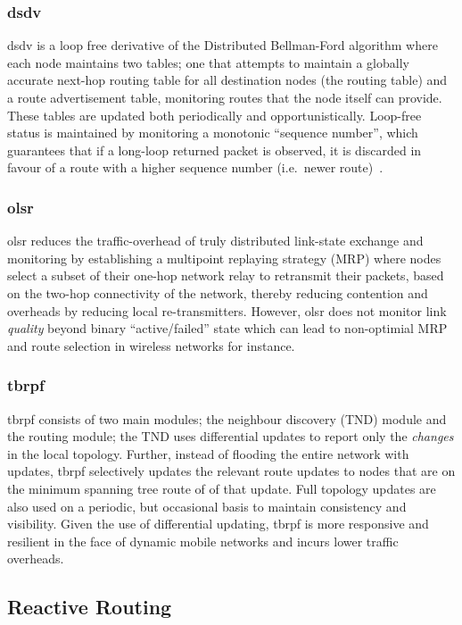 {\subsubsection{\gls{dsdv}}
\acrlong{dsdv} is a loop free derivative of the Distributed Bellman-Ford algorithm where each node maintains two tables; one that attempts to maintain a globally accurate next-hop routing table for all destination nodes (the routing table) and a route advertisement table, monitoring routes that the node itself can provide. These tables are updated both periodically and opportunistically. Loop-free status is maintained by monitoring a monotonic ``sequence number'', which guarantees that if a long-loop returned packet is observed, it is discarded in favour of a route with a higher sequence number (i.e.\ newer route)~\cite{Perkins1994}.\
\subsubsection{\gls{olsr}}
\acrlong{olsr} reduces the traffic-overhead of truly distributed link-state exchange and monitoring by establishing a multipoint replaying strategy (MRP) where nodes select a subset of their one-hop network relay to retransmit their packets, based on the two-hop connectivity of the network, thereby reducing contention and overheads by reducing local re-transmitters. However, \gls{olsr} does not monitor link \emph{quality} beyond binary ``active/failed'' state which can lead to non-optimial MRP and route selection in wireless networks for instance.\\
\subsubsection{\gls{tbrpf}}
\acrlong{tbrpf} consists of two main modules; the neighbour discovery (TND) module and the routing module; the TND uses differential updates to report only the \emph{changes} in the local topology. Further, instead of flooding the entire network with updates, \gls{tbrpf} selectively updates the relevant route updates to nodes that are on the minimum spanning tree route of of that update. Full topology updates are also used on a periodic, but occasional basis to maintain consistency and visibility. Given the use of differential updating, \gls{tbrpf} is more responsive and resilient in the face of dynamic mobile networks and incurs lower traffic overheads.\cite{Bellur1999}\\

\subsection{Reactive Routing}

}
